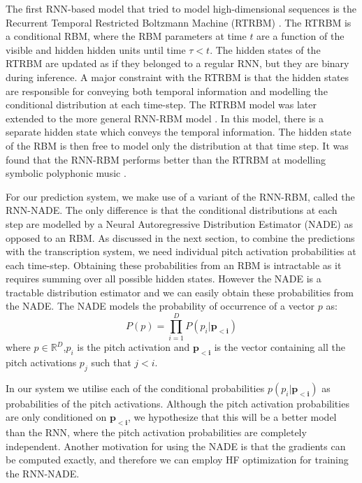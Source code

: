 	The first RNN-based model that tried to model high-dimensional sequences is the Recurrent Temporal Restricted Boltzmann Machine (RTRBM) \cite{sutskever2008recurrent}. The RTRBM is a conditional RBM, where the RBM parameters at time  $t$ are a function of the visible and hidden hidden units until time $\tau < t$. The hidden states of the RTRBM are updated as if they belonged to a regular RNN, but they are binary during inference. A major constraint with the RTRBM is that the hidden states are responsible for conveying both temporal information and modelling the conditional distribution at each time-step. The RTRBM model was later extended to the more general RNN-RBM model \cite{Boulanger-Lewandowski2012}. In this model, there is a separate hidden state which conveys the temporal information. The hidden state of the RBM is then free to model only the distribution at that time step. It was found that the RNN-RBM performs better than the RTRBM at modelling symbolic polyphonic music \cite{Boulanger-Lewandowski2012}. 

	For our prediction system, we make use of a variant of the RNN-RBM, called the RNN-NADE. The only difference is that the conditional distributions at each step are modelled by a Neural Autoregressive Distribution Estimator (NADE) \cite{Larochelle2011} as opposed to an RBM. As discussed in the next section, to combine the predictions with the transcription system, we need individual pitch activation probabilities at each time-step. Obtaining these probabilities from an RBM is intractable as it requires summing over all possible hidden states. However the NADE is a tractable distribution estimator and we can easily obtain these probabilities from the NADE. The NADE models the probability of occurrence of a vector $p$ as: 
	\begin{equation}
		P(p) = \prod_{i=1}^D P(p_i|\mathbf{p_{<i}})
	\end{equation}
	where $ p \in \mathbb{R}^{D}$,$p_{i}$ is the pitch activation and $\mathbf{p_{<i}}$ is the vector containing all the pitch activations $p_j$ such that $j<i$. 
	
	In our system we utilise each of the conditional probabilities $p(p_i|\mathbf{p_{<i}})$ as probabilities of the pitch activations. Although the pitch activation probabilities are only conditioned on $\mathbf{p_{<i}}$, we hypothesize that this will be a better model than the RNN, where the pitch activation probabilities are completely independent. Another motivation for using the NADE is that the gradients can be computed exactly, and therefore we can employ HF optimization for training the RNN-NADE. 

